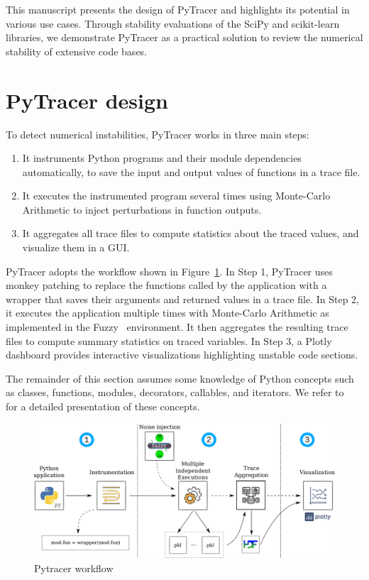 \documentclass[10pt,journal,compsoc]{IEEEtran}
\newcommand{\pytracer}[0]{PyTracer\xspace}
\DeclareRobustCommand{\add}[1]{\textcolor{ao(english)}{#1}}%
\DeclareRobustCommand{\add}[1]{#1}
\begin{document}
This manuscript presents the design of \pytracer and \add{highlights} its potential
in various use cases. Through stability evaluations of the SciPy and
scikit-learn libraries, we demonstrate \pytracer as a practical solution to
review the numerical stability of extensive code bases. 

\section{\pytracer design}

\add{
    To detect numerical instabilities, \pytracer works in three main steps:
    \begin{enumerate}
        \item It instruments Python programs and their module dependencies
              automatically, to save the input and output values of functions in a trace
              file.
        \item It executes the instrumented program several times using Monte-Carlo
              Arithmetic to inject perturbations in function outputs.
        \item It aggregates all trace files to compute statistics about the traced
              values, and visualize them in a GUI.
    \end{enumerate}
    \pytracer adopts the workflow shown in Figure~\ref{fig:workflow}.
    In Step 1, \pytracer uses monkey patching to replace the functions called
    by the application with a wrapper that saves their arguments and returned
    values in a trace file. In Step 2, it executes the application multiple
    times with Monte-Carlo Arithmetic as implemented in the
    Fuzzy~\cite{kiar2020comparing} environment. It then
    aggregates the resulting trace files to compute summary statistics on
    traced variables. In Step 3, a Plotly dashboard provides interactive
    visualizations highlighting unstable code sections.
}

\add{
    The remainder of this section assumes some knowledge of Python concepts
    such as classes, functions, modules, decorators, callables, and iterators.
    We refer to~\cite{beazley2013python} for a detailed presentation of these
    concepts.
}

\begin{figure}
    \centering
    \includegraphics[width=0.75\linewidth]{figure/workflow.pdf}
    \caption{Pytracer workflow
    }
    \label{fig:workflow}
\end{figure}
\end{document}
